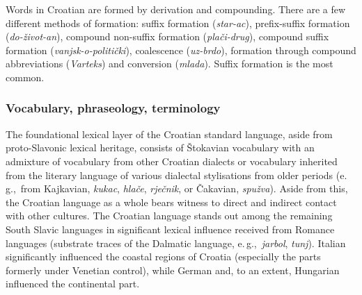 \begin{multicols}{2}
Words in Croatian are formed by derivation and compounding. There are a few different methods of formation: suffix formation (\emph{star-ac}), prefix-suffix formation (\emph{do-život-an}), compound non-suffix formation (\emph{plači-drug}), compound suffix formation (\emph{vanjsk-o-politički}), coalescence (\emph{uz-brdo}), formation through compound abbreviations (\emph{Varteks}) and conversion (\emph{mlada}). Suffix formation is the most common. 

\subsubsection{Vocabulary, phraseology, terminology}

The foundational lexical layer of the Croatian standard language, aside from proto-Slavonic lexical heritage, consists of Štokavian vocabulary with an admixture of vocabulary from other Croatian dialects or vocabulary inherited from the literary language of various dialectal stylisations from older periods (e.\,g.,~from Kajkavian, \emph{kukac}, \emph{hlače}, \emph{rječnik}, or Čakavian, \emph{spužva}). Aside from this, the Croatian language as a whole bears witness to direct and indirect contact with other cultures. The Croatian language stands out among the remaining South Slavic languages in significant lexical influence received from Romance languages (substrate traces of the Dalmatic language, e.\,g.,~\emph{jarbol}, \emph{tunj}).  Italian significantly influenced the coastal regions of Croatia (especially the parts formerly under Venetian control), while German and, to an extent, Hungarian influenced the continental part. 


\end{multicols}
